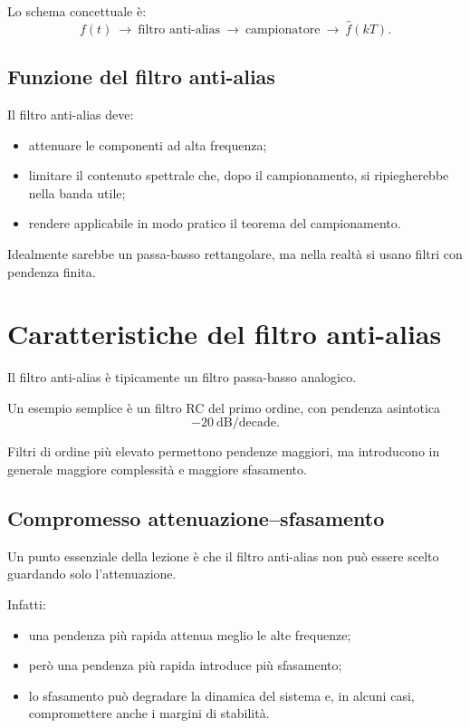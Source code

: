 Lo schema concettuale è:
\[
f(t)\ \longrightarrow\ \text{filtro anti-alias}\ \longrightarrow\ \text{campionatore}\ \longrightarrow\ \hat f(kT).
\]

\subsection{Funzione del filtro anti-alias}

Il filtro anti-alias deve:
\begin{itemize}
    \item attenuare le componenti ad alta frequenza;
    \item limitare il contenuto spettrale che, dopo il campionamento,
    si ripiegherebbe nella banda utile;
    \item rendere applicabile in modo pratico il teorema del campionamento.
\end{itemize}

Idealmente sarebbe un passa-basso rettangolare, ma nella realtà si usano filtri
con pendenza finita.

\section{Caratteristiche del filtro anti-alias}

Il filtro anti-alias è tipicamente un filtro passa-basso analogico.

Un esempio semplice è un filtro RC del primo ordine, con pendenza asintotica
\[
-20\ \text{dB/decade}.
\]

Filtri di ordine più elevato permettono pendenze maggiori, ma introducono
in generale maggiore complessità e maggiore sfasamento.

\subsection{Compromesso attenuazione--sfasamento}

Un punto essenziale della lezione è che il filtro anti-alias non può essere scelto
guardando solo l'attenuazione.

Infatti:
\begin{itemize}
    \item una pendenza più rapida attenua meglio le alte frequenze;
    \item però una pendenza più rapida introduce più sfasamento;
    \item lo sfasamento può degradare la dinamica del sistema e, in alcuni casi,
    compromettere anche i margini di stabilità.
\end{itemize}

